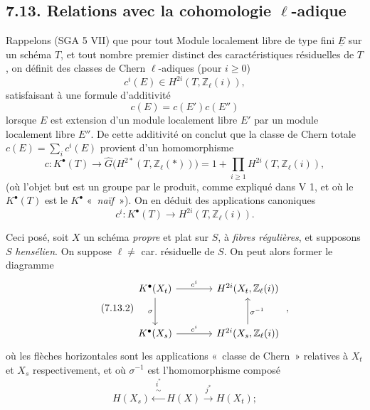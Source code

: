 
\subsection*{7.13. Relations avec la cohomologie \(\ell\)-adique}
Rappelons (SGA 5 VII) que pour tout Module localement libre de type fini \(\underline{E}\) sur un schéma \(T\), et tout nombre premier distinct des caractéristiques résiduelles de \(T\), on définit des classes de Chern \(\ell\)-adiques (pour \(i\geq 0\))
\[
  c^i(E)\in H^{2i}(T,\mathbb Z_\ell(i)),
\]
satisfaisant à une formule d'additivité
\[
  c(E)=c(E')c(E'')
\]
lorsque \(E\) est extension d'un module localement libre \(E'\) par un module localement libre \(E''\). De cette additivité on conclut que la classe de Chern totale \(c(E)=\sum_i c^i(E)\) provient d'un homomorphisme
\begin{equation}\tag{7.13.0}
  c:K^\bullet(T)\longrightarrow
  \widehat G\bigl(H^{2*}(T,\mathbb Z_\ell(*))\bigr)
  =
  1+\prod_{i\geq 1}H^{2i}(T,\mathbb Z_\ell(i)),
\end{equation}
(où l'objet but est un groupe par le produit, comme expliqué dans V 1, et où le \(K^\bullet(T)\) est le \(K^\bullet\) «~\emph{naïf}~»). On en déduit des applications canoniques
\begin{equation}\tag{7.13.1}
  c^i:K^\bullet(T)\longrightarrow H^{2i}(T,\mathbb Z_\ell(i)).
\end{equation}

Ceci posé, soit \(X\) un schéma \emph{propre} et plat sur \(S\), à \emph{fibres régulières}, et supposons \(S\) \emph{hensélien}. On suppose \(\ell\neq\) car. résiduelle de \(S\). On peut alors former le diagramme
\begin{equation}\tag{7.13.2}
\begin{tikzcd}[column sep=large,row sep=large]
K^\bullet(X_t) \arrow[r,"c^i"] \arrow[d,"\sigma"'] &
H^{2i}(X_t,\mathbb Z_\ell(i))\\
K^\bullet(X_s) \arrow[r,"c^i"] & H^{2i}(X_s,\mathbb Z_\ell(i)) \arrow[u,"\sigma^{-1}"']
\end{tikzcd}
\;,
\end{equation}
où les flèches horizontales sont les applications «~classe de Chern~» relatives à \(X_t\) et \(X_s\) respectivement, et où \(\sigma^{-1}\) est l'homomorphisme composé
\[
  H(X_s)\xleftarrow{\substack{i^*\\\sim}}H(X)\xrightarrow{j^*}H(X_t);
\]
